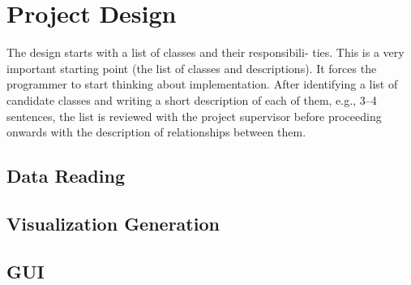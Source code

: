 \clearpage
\section{Project Design}
 
 The design starts with a list of classes and their responsibili- ties. This is a very important starting point (the list of classes and descriptions). It forces the programmer to start thinking about implementation.
 After identifying a list of candidate classes and writing a short description of each of them, e.g., 3–4 sentences, the list is reviewed with the project supervisor before proceeding onwards with the description of relationships between them.

\subsection{Data Reading}


\subsection{Visualization Generation}

\subsection{GUI}
